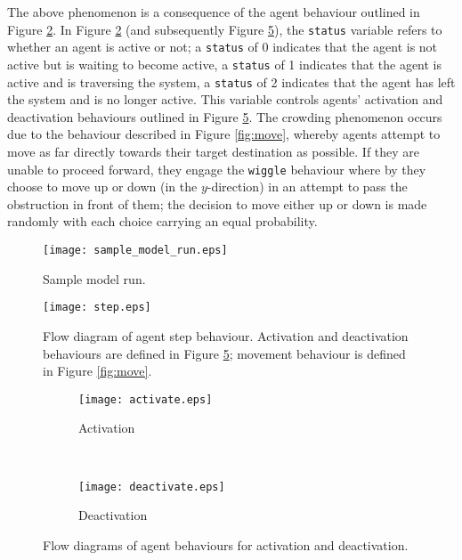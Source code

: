 The above phenomenon is a consequence of the agent behaviour outlined in Figure
\ref{fig:step}.
In Figure \ref{fig:step} (and subsequently Figure \ref{fig:act_deact}), the
\texttt{status} variable refers to whether an agent is active or not; a
\texttt{status} of 0 indicates that the agent is not active but is waiting to
become active, a \texttt{status} of 1 indicates that the agent is active and is
traversing the system, a \texttt{status} of 2 indicates that the agent has left
the system and is no longer active.
This variable controls agents' activation and deactivation behaviours outlined
in Figure \ref{fig:act_deact}.
The crowding phenomenon occurs due to the behaviour described in Figure
\ref{fig:move}, whereby agents attempt to move as far directly towards their
target destination as possible.
If they are unable to proceed forward, they engage the \texttt{wiggle} behaviour
where by they choose to move up or down (in the $y$-direction) in an attempt to
pass the obstruction in front of them; the decision to move either up or down is
made randomly with each choice carrying an equal probability.

\begin{figure}[!htb]
    \centering
    \texttt{[image: sample\_model\_run.eps]}
    \caption{Sample model run.}\label{fig:sample_model_run}
\end{figure}

\begin{figure}[!htb]
    \centering
    \texttt{[image: step.eps]}
    \caption{Flow diagram of agent step behaviour. Activation and deactivation
        behaviours are defined in Figure \ref{fig:act_deact}; movement behaviour
    is defined in Figure \ref{fig:move}.}\label{fig:step}
\end{figure}

\begin{figure}[!htb]
    \centering
    \begin{subfigure}[h]{0.4\textwidth}
        \texttt{[image: activate.eps]}
        \caption{Activation}\label{fig:act_deact:act}
    \end{subfigure}
    ~
    \begin{subfigure}[h]{0.3\textwidth}
        \texttt{[image: deactivate.eps]}
        \caption{Deactivation}\label{fig:act_deact:deact}
    \end{subfigure}
    \caption{Flow diagrams of agent behaviours for activation and deactivation.}
    \label{fig:act_deact}
\end{figure}


